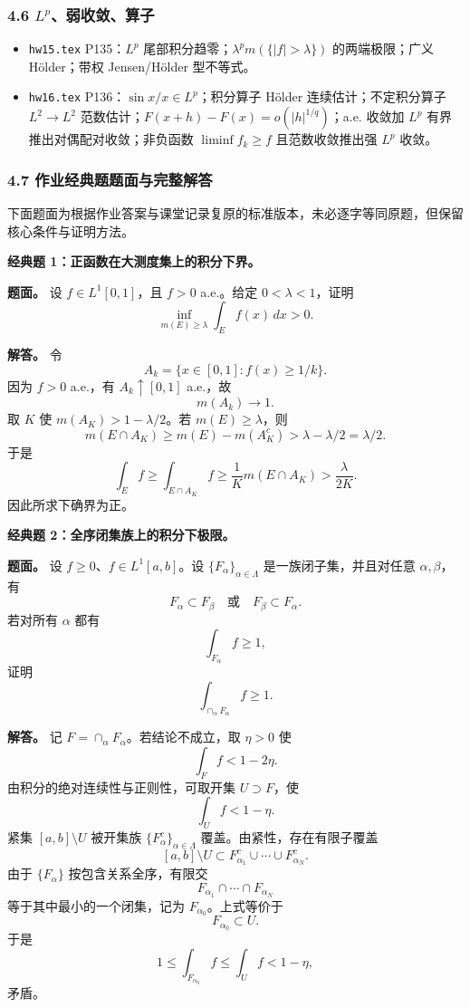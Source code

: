 \documentclass[
UTF8]{ctexart}
\providecommand{\tightlist}{%
\setlength{\itemsep}{0pt}\setlength{\parskip}{0pt}}
\newcommand{\impB}{\hspace{0.4em}{\small\textcolor{impBColor}{\textbf{[B 重要]}}}}
\newcommand{\impC}{\hspace{0.4em}{\small\textcolor{impCColor}{\textbf{[C 专题]}}}}
\begin{document}
\subsubsection{\texorpdfstring{4.6
\(L^p\)、弱收敛、算子}{4.6 L\^{}p、弱收敛、算子}}\label{lpux5f31ux6536ux655bux7b97ux5b50}

\begin{itemize}
    \tightlist
  \item
    \texttt{hw15.tex} P135：\(L^p\)
    尾部积分趋零；\(\lambda^p m(\{|f|>\lambda\})\) 的两端极限；广义
    Hölder；带权 Jensen/Hölder 型不等式。
  \item
    \texttt{hw16.tex} P136：\(\sin x/x\in L^p\)；积分算子 Hölder
    连续估计；不定积分算子 \(L^2\to L^2\)
    范数估计；\(F(x+h)-F(x)=o(|h|^{1/q})\)；a.e. 收敛加 \(L^p\)
    有界推出对偶配对收敛；非负函数 \(\liminf f_k\ge f\) 且范数收敛推出强
    \(L^p\) 收敛。
\end{itemize}

\subsubsection{4.7
作业经典题题面与完整解答}\label{ux4f5cux4e1aux7ecfux5178ux9898ux9898ux9762ux4e0eux5b8cux6574ux89e3ux7b54}

下面题面为根据作业答案与课堂记录复原的标准版本，未必逐字等同原题，但保留核心条件与证明方法。

\textbf{经典题 1：正函数在大测度集上的积分下界。}\impB

\textbf{题面。} 设 \(f\in L^1[0,1]\)，且 \(f>0\) a.e.。给定
\(0<\lambda<1\)，证明
\[
  \inf_{m(E)\ge\lambda}\int_E f(x)\,dx>0.
\]

\textbf{解答。} 令
\[
  A_k=\{x\in[0,1]:f(x)\ge 1/k\}.
\]
因为 \(f>0\) a.e.，有 \(A_k\uparrow[0,1]\) a.e.，故
\[
  m(A_k)\to1.
\]
取 \(K\) 使 \(m(A_K)>1-\lambda/2\)。若 \(m(E)\ge\lambda\)，则
\[
  m(E\cap A_K)\ge m(E)-m(A_K^c)>\lambda-\lambda/2=\lambda/2.
\]
于是
\[
  \int_E f\ge\int_{E\cap A_K}f\ge \frac1K m(E\cap A_K)>\frac{\lambda}{2K}.
\]
因此所求下确界为正。

\textbf{经典题 2：全序闭集族上的积分下极限。}\impC

\textbf{题面。} 设 \(f\ge0\)、\(f\in L^1[a,b]\)。设 \(\{F_\alpha\}_{\alpha\in\Lambda}\)
是一族闭子集，并且对任意 \(\alpha,\beta\)，有
\[
  F_\alpha\subset F_\beta\quad\text{或}\quad F_\beta\subset F_\alpha.
\]
若对所有 \(\alpha\) 都有
\[
  \int_{F_\alpha} f\ge1,
\]
证明
\[
  \int_{\cap_{\alpha}F_\alpha} f\ge1.
\]

\textbf{解答。} 记 \(F=\cap_\alpha F_\alpha\)。若结论不成立，取
\(\eta>0\) 使
\[
  \int_F f<1-2\eta.
\]
由积分的绝对连续性与正则性，可取开集 \(U\supset F\)，使
\[
  \int_U f<1-\eta.
\]
紧集 \([a,b]\setminus U\) 被开集族 \(\{F_\alpha^c\}_{\alpha\in\Lambda}\) 覆盖。由紧性，存在有限子覆盖
\[
  [a,b]\setminus U\subset F_{\alpha_1}^c\cup\cdots\cup F_{\alpha_N}^c.
\]
由于 \(\{F_\alpha\}\) 按包含关系全序，有限交
\[
  F_{\alpha_1}\cap\cdots\cap F_{\alpha_N}
\]
等于其中最小的一个闭集，记为 \(F_{\alpha_0}\)。上式等价于
\[
  F_{\alpha_0}\subset U.
\]
于是
\[
  1\le \int_{F_{\alpha_0}}f\le \int_U f<1-\eta,
\]
矛盾。
\end{document}

